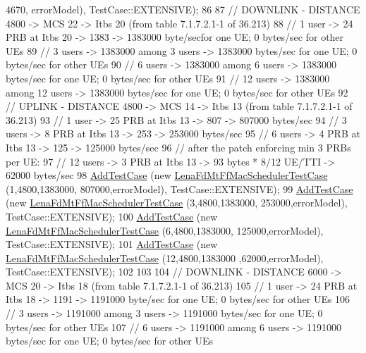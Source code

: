\begin{DoxyCode}
      4670, errorModel), TestCase::EXTENSIVE);
86 
87   \textcolor{comment}{// DOWNLINK - DISTANCE 4800 -> MCS 22 -> Itbs 20 (from table 7.1.7.2.1-1 of 36.213)}
88   \textcolor{comment}{// 1 user -> 24 PRB at Itbs 20 -> 1383 -> 1383000 byte/secfor one UE; 0 bytes/sec for other UEs}
89   \textcolor{comment}{// 3 users -> 1383000 among 3 users -> 1383000 bytes/sec for one UE; 0 bytes/sec for other UEs}
90   \textcolor{comment}{// 6 users -> 1383000 among 6 users -> 1383000 bytes/sec for one UE; 0 bytes/sec for other UEs}
91   \textcolor{comment}{// 12 users -> 1383000 among 12 users -> 1383000 bytes/sec for one UE; 0 bytes/sec for other UEs}
92   \textcolor{comment}{// UPLINK - DISTANCE 4800 -> MCS 14 -> Itbs 13 (from table 7.1.7.2.1-1 of 36.213)}
93   \textcolor{comment}{// 1 user -> 25 PRB at Itbs 13 -> 807 -> 807000 bytes/sec}
94   \textcolor{comment}{// 3 users -> 8 PRB at Itbs 13 -> 253 -> 253000 bytes/sec}
95   \textcolor{comment}{// 6 users -> 4 PRB at Itbs 13 -> 125 -> 125000 bytes/sec}
96   \textcolor{comment}{// after the patch enforcing min 3 PRBs per UE:}
97   \textcolor{comment}{// 12 users -> 3 PRB at Itbs 13 -> 93  bytes * 8/12 UE/TTI  -> 62000 bytes/sec}
98   \hyperlink{classns3_1_1TestCase_a3718088e3eefd5d6454569d2e0ddd835}{AddTestCase} (\textcolor{keyword}{new} \hyperlink{classLenaFdMtFfMacSchedulerTestCase}{LenaFdMtFfMacSchedulerTestCase} (1,4800,1383000,
      807000,errorModel), TestCase::EXTENSIVE);
99   \hyperlink{classns3_1_1TestCase_a3718088e3eefd5d6454569d2e0ddd835}{AddTestCase} (\textcolor{keyword}{new} \hyperlink{classLenaFdMtFfMacSchedulerTestCase}{LenaFdMtFfMacSchedulerTestCase} (3,4800,1383000,
      253000,errorModel), TestCase::EXTENSIVE);
100   \hyperlink{classns3_1_1TestCase_a3718088e3eefd5d6454569d2e0ddd835}{AddTestCase} (\textcolor{keyword}{new} \hyperlink{classLenaFdMtFfMacSchedulerTestCase}{LenaFdMtFfMacSchedulerTestCase} (6,4800,1383000,
      125000,errorModel), TestCase::EXTENSIVE);
101   \hyperlink{classns3_1_1TestCase_a3718088e3eefd5d6454569d2e0ddd835}{AddTestCase} (\textcolor{keyword}{new} \hyperlink{classLenaFdMtFfMacSchedulerTestCase}{LenaFdMtFfMacSchedulerTestCase} (12,4800,1383000
      ,62000,errorModel), TestCase::EXTENSIVE);
102 
103 
104   \textcolor{comment}{// DOWNLINK - DISTANCE 6000 -> MCS 20 -> Itbs 18 (from table 7.1.7.2.1-1 of 36.213)}
105   \textcolor{comment}{// 1 user -> 24 PRB at Itbs 18 -> 1191 -> 1191000 byte/sec for one UE; 0 bytes/sec for other UEs}
106   \textcolor{comment}{// 3 users -> 1191000 among 3 users -> 1191000 bytes/sec for one UE; 0 bytes/sec for other UEs}
107   \textcolor{comment}{// 6 users -> 1191000 among 6 users -> 1191000 bytes/sec for one UE; 0 bytes/sec for other UEs}

\end{DoxyCode}
